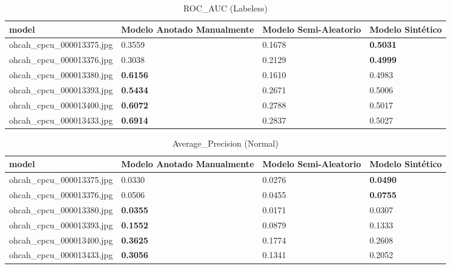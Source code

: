 \documentclass[twocolumn, fontsize=10pt]{article}
\begin{document}
\begin{table*}[ht]
\centering
\caption{ROC\_AUC (Labeless)}
\label{tab:roc_auc_labeless}
\setlength{\tabcolsep}{6pt}
\renewcommand{\arraystretch}{1.2}
\begin{tabular}{|l|l|l|l|}
\hline
model & Modelo Anotado Manualmente & Modelo Semi-Aleatorio & Modelo Sintético \\ \hline
ohcah\_cpcu\_000013375.jpg & 0.3559 & 0.1678 & \textbf{0.5031} \\ \hline
ohcah\_cpcu\_000013376.jpg & 0.3038 & 0.2129 & \textbf{0.4999} \\ \hline
ohcah\_cpcu\_000013380.jpg & \textbf{0.6156} & 0.1610 & 0.4983 \\ \hline
ohcah\_cpcu\_000013393.jpg & \textbf{0.5434} & 0.2671 & 0.5006 \\ \hline
ohcah\_cpcu\_000013400.jpg & \textbf{0.6072} & 0.2788 & 0.5017 \\ \hline
ohcah\_cpcu\_000013433.jpg & \textbf{0.6914} & 0.2837 & 0.5027 \\ \hline
\end{tabular}
\end{table*}



\begin{table*}[ht]
\centering
\caption{Average\_Precision (Normal)}
\label{tab:avg_prec_normal}
\setlength{\tabcolsep}{6pt}
\renewcommand{\arraystretch}{1.2}
\begin{tabular}{|l|l|l|l|}
\hline
model & Modelo Anotado Manualmente & Modelo Semi-Aleatorio & Modelo Sintético \\ \hline
ohcah\_cpcu\_000013375.jpg & 0.0330 & 0.0276 & \textbf{0.0490} \\ \hline
ohcah\_cpcu\_000013376.jpg & 0.0506 & 0.0455 & \textbf{0.0755} \\ \hline
ohcah\_cpcu\_000013380.jpg & \textbf{0.0355} & 0.0171 & 0.0307 \\ \hline
ohcah\_cpcu\_000013393.jpg & \textbf{0.1552} & 0.0879 & 0.1333 \\ \hline
ohcah\_cpcu\_000013400.jpg & \textbf{0.3625} & 0.1774 & 0.2608 \\ \hline
ohcah\_cpcu\_000013433.jpg & \textbf{0.3056} & 0.1341 & 0.2052 \\ \hline
\end{tabular}
\end{table*}
\end{document}
